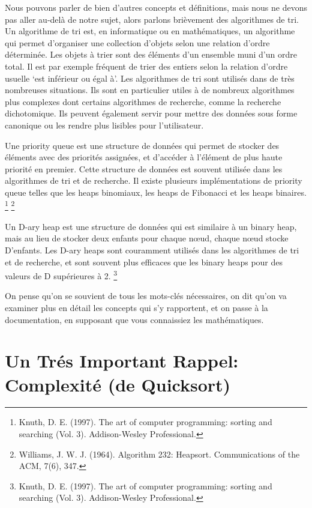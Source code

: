 \documentclass{article}
\begin{document}
        Nous pouvons parler de bien d'autres concepts et définitions, mais nous ne devons pas aller au-delà de notre sujet, alors parlons brièvement des algorithmes de tri. Un algorithme de tri est, en informatique ou en mathématiques, un algorithme qui permet d'organiser une collection d'objets selon une relation d'ordre déterminée. Les objets à trier sont des éléments d'un ensemble muni d'un ordre total. Il est par exemple fréquent de trier des entiers selon la relation d'ordre usuelle `est inférieur ou égal à'. Les algorithmes de tri sont utilisés dans de très nombreuses situations. Ils sont en particulier utiles à de nombreux algorithmes plus complexes dont certains algorithmes de recherche, comme la recherche dichotomique. Ils peuvent également servir pour mettre des données sous forme canonique ou les rendre plus lisibles pour l'utilisateur. 

        Une priority queue est une structure de données qui permet de stocker des éléments avec des priorités assignées, et d'accéder à l'élément de plus haute priorité en premier. Cette structure de données est souvent utilisée dans les algorithmes de tri et de recherche. Il existe plusieurs implémentations de priority queue telles que les heaps binomiaux, les heaps de Fibonacci et les heaps binaires. \footnote{Knuth, D. E. (1997). The art of computer programming: sorting and searching (Vol. 3). Addison-Wesley Professional.} \footnote{Williams, J. W. J. (1964). Algorithm 232: Heapsort. Communications of the ACM, 7(6), 347.}

        Un D-ary heap est une structure de données qui est similaire à un binary heap, mais au lieu de stocker deux enfants pour chaque nœud, chaque nœud stocke D'enfants. Les D-ary heaps sont couramment utilisés dans les algorithmes de tri et de recherche, et sont souvent plus efficaces que les binary heaps pour des valeurs de D supérieures à 2. \footnote{Knuth, D. E. (1997). The art of computer programming: sorting and searching (Vol. 3). Addison-Wesley Professional.}

        On pense qu'on se souvient de tous les mots-clés nécessaires, on dit qu'on va examiner plus en détail les concepts qui s'y rapportent, et on passe à la documentation, en supposant que vous connaissiez les mathématiques.

        \newpage

    
    
    \section*{Un Trés Important Rappel: Complexité (de Quicksort)}
\end{document}
